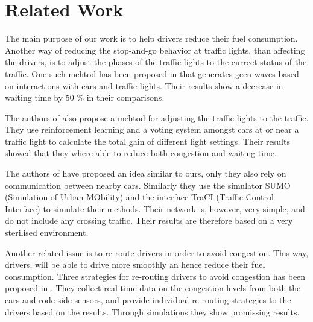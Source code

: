 \section{Related Work}

The main purpose of our work is to help drivers reduce their fuel consumption.
Another way of reducing the stop-and-go behavior at traffic lights, than affecting the drivers, is to adjust the phases of the traffic lights to the currect status of the traffic. One such mehtod has been proposed in \cite{SOTL} that generates geen waves based on interactions with cars and traffic lights. Their results show a decrease in waiting time by 50 \% in their comparisons.

The authors of \cite{ITLC} also propose a mehtod for adjusting the traffic lights to the traffic. They use reinforcement learning and a voting system amongst cars at or near a traffic light to calculate the total gain of different light settings. Their results showed that they where able to reduce both congestion and waiting time.

The authors of \cite{VANETsim} have proposed an idea similar to ours, only they also rely on communication between nearby cars.
Similarly they use the simulator SUMO (Simulation of Urban MObility) and the interface TraCI (Traffic Control Interface) to simulate their methods. Their network is, however, very simple, and do not include any crossing traffic. Their results are therefore based on a very sterilised environment.

Another related issue is to re-route drivers in order to avoid congestion. This way, drivers, will be able to drive more smoothly an hence reduce their fuel consumption. 
Three strategies for re-routing drivers to avoid congestion has been proposed in \cite{congestionAvoidance}. They collect real time data on the congestion levels from both the cars and rode-side sensors, and provide individual re-routing strategies to the drivers based on the results. Through simulations they show promissing results.


